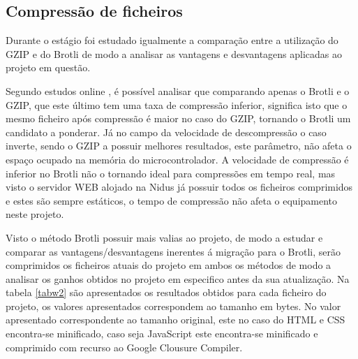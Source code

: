 \subsection{Compressão de ficheiros}

\par Durante o estágio foi estudado igualmente a comparação entre a utilização do GZIP e do Brotli de modo a analisar as vantagens e desvantagens aplicadas ao projeto em questão.
\par Segundo estudos online \cite{brotlivsgzip}, é possível analisar que comparando apenas o Brotli e o GZIP, que este último tem uma taxa de compressão inferior, significa isto que o mesmo ficheiro após compressão é maior no caso do GZIP, tornando o Brotli um candidato a ponderar. Já no campo da velocidade de descompressão o caso inverte, sendo o GZIP a possuir melhores resultados, este parâmetro, não afeta o espaço ocupado na memória do microcontrolador. A velocidade de compressão é inferior no Brotli não o tornando ideal para compressões em tempo real, mas visto o servidor WEB alojado na Nidus já possuir todos os ficheiros comprimidos e estes são sempre estáticos, o tempo de compressão não afeta o equipamento neste projeto. 
\par Visto o método Brotli possuir mais valias ao projeto, de modo a estudar e comparar as vantagens/desvantagens inerentes á migração para o Brotli, serão comprimidos os ficheiros atuais do projeto em ambos os métodos de modo a analisar os ganhos obtidos no projeto em especifico antes da sua atualização. Na tabela \ref{tabw2} são apresentados os resultados obtidos para cada ficheiro do projeto, os valores apresentados correspondem ao tamanho em bytes. No valor apresentado correspondente ao tamanho original, este no caso do HTML e CSS encontra-se minificado, caso seja JavaScript este encontra-se minificado e comprimido com recurso ao Google Clousure Compiler.


